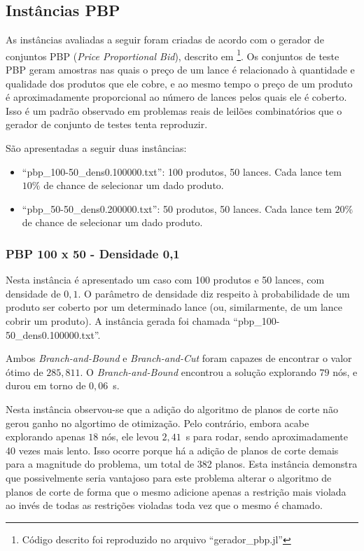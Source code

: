 \documentclass{article}
\begin{document}
    
    
    \subsection{Instâncias PBP}
    
    As instâncias avaliadas a seguir foram criadas de acordo com o gerador de conjuntos PBP (\emph{Price Proportional Bid}), descrito em \cite{guo2005using}\footnote{
    Código descrito foi reproduzido no arquivo \enquote{gerador\_pbp.jl}}.
    Os conjuntos de teste PBP geram amostras nas quais o preço de um lance é relacionado à quantidade e qualidade dos produtos que ele cobre, e ao mesmo tempo o preço de um produto é aproximadamente proporcional ao número de lances pelos quais ele é coberto. Isso é um padrão observado em problemas reais de leilões combinatórios que o gerador de conjunto de testes tenta reproduzir.
    
    São apresentadas a seguir duas instâncias:
    \begin{itemize}
        \item \enquote{pbp\_100-50\_dens0.100000.txt}: 100 produtos, 50 lances. Cada lance tem $10\%$ de chance de selecionar um dado produto.
        \item \enquote{pbp\_50-50\_dens0.200000.txt}: 50 produtos, 50 lances. Cada lance tem $20\%$ de chance de selecionar um dado produto.
    \end{itemize}
    
    \subsubsection{PBP 100 x 50 - Densidade 0,1}
    
    Nesta instância é apresentado um caso com 100 produtos e 50 lances, com densidade de $0{,}1$. O parâmetro de densidade diz respeito à probabilidade de um produto ser coberto por um determinado lance (ou, similarmente, de um lance cobrir um produto). A instância gerada foi chamada \enquote{pbp\_100-50\_dens0.100000.txt}.
    
    Ambos \emph{Branch-and-Bound} e \emph{Branch-and-Cut} foram capazes de encontrar o valor ótimo de $285{,}811$. O \emph{Branch-and-Bound} encontrou a solução explorando $79$ nós, e durou em torno de $0{,}06$~s. 
    
    Nesta instância observou-se que a adição do algoritmo de planos de corte não gerou ganho no algortimo de otimização. Pelo contrário, embora acabe explorando apenas $18$ nós, ele levou $2{,}41$~s para rodar, sendo aproximadamente 40 vezes mais lento. Isso ocorre porque há a adição de planos de corte demais para a magnitude do problema, um total de 382 planos. Esta instância demonstra que possivelmente seria vantajoso para este problema alterar o algoritmo de planos de corte de forma que o mesmo adicione apenas a restrição mais violada ao invés de todas as restrições violadas toda vez que o mesmo é chamado.
    
\end{document}
